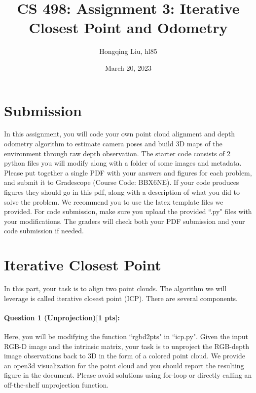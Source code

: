 \documentclass[11pt]{article}
\begin{document}
\author{Hongqing Liu, hl85}
\title{CS 498: Assignment 3: Iterative Closest Point and Odometry}
\date{March 20, 2023}
\maketitle

\medskip


\section*{Submission}
In this assignment, you will code your own point cloud alignment and depth odometry algorithm to estimate camera poses and build 3D maps of the environment through raw depth observation. The starter code consists of 2 python files you will modify along with a folder of some images and metadata. Please put together a single PDF with your answers and figures for each problem, and submit it to Gradescope (Course Code: BBX6NE). If your code produces figures they should go in this pdf, along with a description of what you did to solve the problem. We recommend you to use the latex template files we provided. For code submission, make sure you upload the provided ``.py" files with your modifications. The graders will check both your PDF submission and your code submission if needed. 

\section*{Iterative Closest Point} 

In this part, your task is to align two point clouds. The algorithm we will leverage is called iterative closest point (ICP). There are several components. 

\paragraph{Question 1 (Unprojection)[1 pts]:} Here, you will be modifying the function ``rgbd2pts" in ``icp.py". Given the input RGB-D image and the intrinsic matrix, your task is to unproject the RGB-depth image observations back to 3D in the form of a colored point cloud. We provide an open3d visualization for the point cloud and you should report the resulting figure in the document. Please avoid solutions using for-loop or directly calling an off-the-shelf unprojection function.
\end{document}
